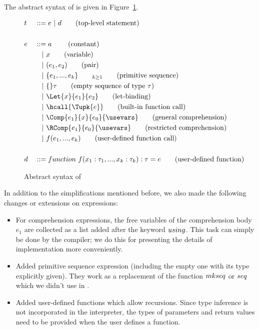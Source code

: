 The abstract syntax of \mysnesl is given in Figure~\ref{fig-mysnesl}. 
 

\begin{figure}[H]\large
	\begin{alignat*}{2}
	& t &&::= e \ | \ d  \tag{top-level statement} \\
	\\
	& e &&::=  a \     \tag{constant} \\
	&   && \quad | \ x  \tag{variable} \\
	&   && \quad | \ (e_1,e_2) \tag{pair}\\
	&   && \quad | \ \{e_1,...,e_k \}_{\qquad k \ge 1}	\tag{primitive sequence} \\
	&   && \quad | \ \{ \}\tau			\tag{empty sequence of type $\tau$} \\
	&   && \quad | \ \Let{x}{e_1}{e_2} \tag{let-binding}\\
	&   && \quad | \ \hcall{\Tupk{e}}  \tag{built-in function call} \\
	&   && \quad | \ \Comp{e_1}{x}{e_0}{\usevars} \tag{general comprehension} \\
	&   && \quad | \ \RComp{e_1}{e_0}{\usevars} \tag {restricted comprehension} \\
	&   && \quad | \ f(e_1,...,e_k)  \tag {user-defined function call} \\
	\\
	& d &&::= \*{function} \  f(x_1: \tau_1, ..., x_k: \tau_k): \tau = e  \tag{user-defined function}
	\end{alignat*}
	\caption{Abstract syntax of \mysnesl \label{fig-mysnesl}}
\end{figure}

In addition to the simplifications mentioned before, we also made the following changes or extensions on expressions:

\begin{itemize}
	\item For comprehension expressions, the free variables of the comprehension body $e_1$ are collected as a list added after the keyword $\*{using}$. This task can simply be done by the compiler; we do this for presenting the details of implementation more conveniently.
	
	\item Added primitive sequence expression (including the empty one with its type explicitly given). They work as a replacement of the function $\*{mkseq}$ or $\*{seq}$ which we didn't use in \mysnesl.
	
	\item Added user-defined functions which allow recursions. Since type inference is not incorporated in the interpreter, the types of  parameters and return values need to be provided when the user defines a function.
\end{itemize}


